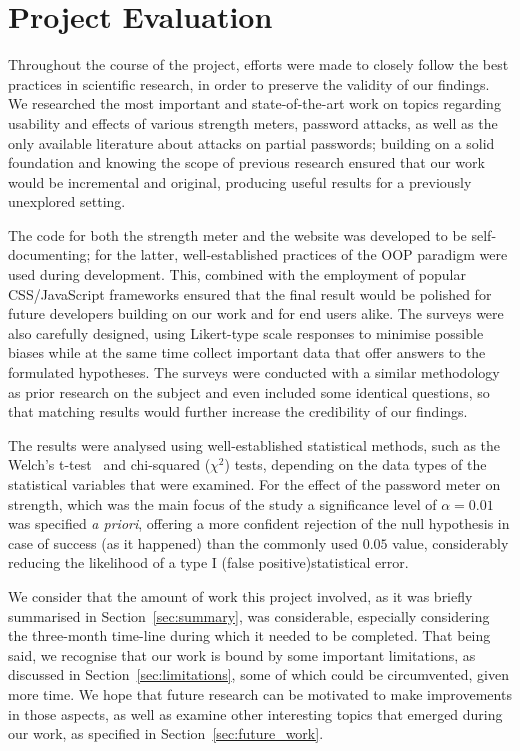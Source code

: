  \section{Project Evaluation}
    \label{sec:evaluation}
    Throughout the course of the project, efforts were made to closely follow the best practices in scientific research, in order to preserve the validity of our findings. We researched the most important and state-of-the-art work on topics regarding usability and effects of various strength meters, password attacks, as well as the only available literature about attacks on partial passwords; building on a solid foundation and knowing the scope of previous research ensured that our work would be incremental and original, producing useful results for a previously unexplored setting.

    The code for both the strength meter and the website was developed to be self-documenting; for the latter, well-established practices of the OOP paradigm were used during development. This, combined with the employment of popular CSS/JavaScript frameworks ensured that the final result would be polished for future developers building on our work and for end users alike. The surveys were also carefully designed, using Likert-type scale responses to minimise possible biases while at the same time collect important data that offer answers to the formulated hypotheses. The surveys were conducted with a similar methodology as prior research on the subject and even included some identical questions, so that matching results would further increase the credibility of our findings.

    The results were analysed using well-established statistical methods, such as the Welch's t-test~\cite{t_test} and chi-squared ($\chi^2$) tests, depending on the data types of the statistical variables that were examined. For the effect of the password meter on strength, which was the main focus of the study a significance level of $\alpha = 0.01$ was specified \emph{a priori}, offering a more confident rejection of the null hypothesis in case of success (as it happened) than the commonly used $0.05$ value, considerably reducing the likelihood of a type I (false positive)statistical error.

    We consider that the amount of work this project involved, as it was briefly summarised in Section~\ref{sec:summary}, was considerable, especially considering the three-month time-line during which it needed to be completed. That being said, we recognise that our work is bound by some important limitations, as discussed in Section~\ref{sec:limitations}, some of which could be circumvented, given more time. We hope that future research can be motivated to make improvements in those aspects, as well as examine other interesting topics that emerged during our work, as specified in Section~\ref{sec:future_work}.


